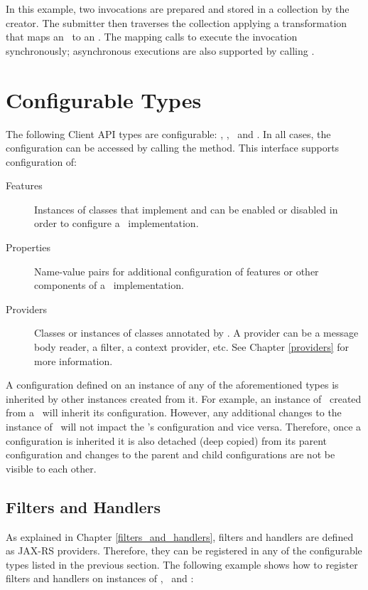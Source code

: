 In this example, two invocations are prepared and stored in a collection by the creator. The submitter then traverses the collection applying a transformation that maps an \Invocation\ to an \HttpResponse. The mapping calls  to execute the invocation synchronously; asynchronous executions are also supported by calling .

\section{Configurable Types}
\label{configurable_types}

The following Client API types are configurable: \Client, \Invocation, \InvocationBuilder\ and \Target. In all cases, the configuration can be accessed by calling the  method. This interface supports configuration of:

\begin{description}
\item [Features] Instances of classes that implement  and can be enabled or disabled in order to configure a \jaxrs\ implementation.
\item [Properties] Name-value pairs for additional configuration of features or other components of a \jaxrs\ implementation.
\item [Providers] Classes or instances of classes annotated by \Provider. A provider can be a message body reader, a filter, a context provider, etc. See Chapter \ref{providers} for more information.
\end{description}

A configuration defined on an instance of any of the aforementioned types is inherited by other instances created from it. For example, an instance of \Target\ created from a \Client\ will inherit its configuration. However, any additional changes to the instance of \Target\ will not impact the \Client's configuration and vice versa. Therefore, once a configuration is inherited it is also detached (deep copied) from its parent configuration and changes to the parent and child configurations are not be visible to each other.

\subsection{Filters and Handlers}
\label{filters_handlers_client}

As explained in Chapter \ref{filters_and_handlers}, filters and handlers are defined as JAX-RS providers. Therefore, they can be registered in any of the configurable types listed in the previous section. The following example shows how to register filters and handlers on instances of \Client, \Target\ and \Invocation:

